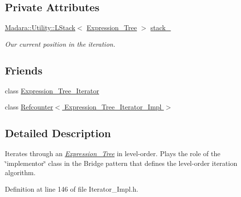 \subsection*{Private Attributes}
\begin{DoxyCompactItemize}
\item 
\hyperlink{classMadara_1_1Utility_1_1LStack}{Madara::Utility::LStack}$<$ \hyperlink{classMadara_1_1Expression__Tree_1_1Expression__Tree}{Expression\_\-Tree} $>$ \hyperlink{classMadara_1_1Expression__Tree_1_1Pre__Order__Iterator__Impl_a0aec16480c8395ea0fb381982d710634}{stack\_\-}
\begin{DoxyCompactList}\small\item\em Our current position in the iteration. \item\end{DoxyCompactList}\end{DoxyCompactItemize}
\subsection*{Friends}
\begin{DoxyCompactItemize}
\item 
class \hyperlink{classMadara_1_1Expression__Tree_1_1Pre__Order__Iterator__Impl_adfe8d209b4dd64ac100d4c9c9adf08c1}{Expression\_\-Tree\_\-Iterator}
\item 
class \hyperlink{classMadara_1_1Expression__Tree_1_1Pre__Order__Iterator__Impl_aebe1f916414d809cae08793459b42a35}{Refcounter$<$ Expression\_\-Tree\_\-Iterator\_\-Impl $>$}
\end{DoxyCompactItemize}


\subsection{Detailed Description}
Iterates through an {\itshape \hyperlink{classMadara_1_1Expression__Tree_1_1Expression__Tree}{Expression\_\-Tree}\/} in level-\/order. Plays the role of the \char`\"{}implementor\char`\"{} class in the Bridge pattern that defines the level-\/order iteration algorithm. 

Definition at line 146 of file Iterator\_\-Impl.h.



